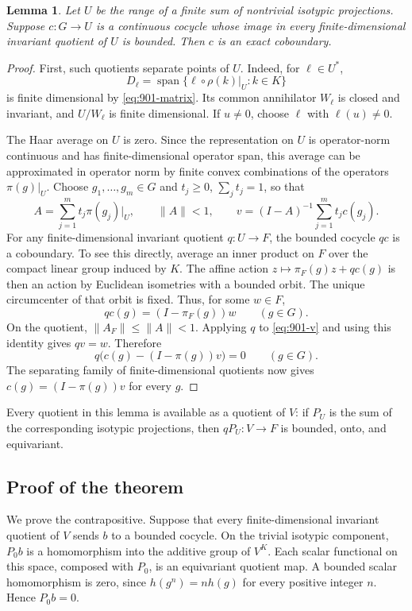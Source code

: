 \documentclass[11pt,a4paper]{article}
\newtheorem{lemma}[theorem]{Lemma}
\theoremstyle{remark}
\begin{document}
\begin{lemma}\label{lem:901-type}
Let $U$ be the range of a finite sum of nontrivial isotypic projections.
Suppose $c:G\to U$ is a continuous cocycle whose image in every
finite-dimensional invariant quotient of $U$ is bounded. Then $c$ is an
exact coboundary.
\end{lemma}

\begin{proof}
First, such quotients separate points of $U$. Indeed, for $\ell\in U^*$,
\[
 D_\ell=\operatorname{span}\{\ell\circ\rho(k)|_U:k\in K\}
\]
is finite dimensional by \eqref{eq:901-matrix}. Its common annihilator
$W_\ell$ is closed and invariant, and $U/W_\ell$ is finite dimensional.
If $u\ne0$, choose $\ell$ with $\ell(u)\ne0$.

The Haar average on $U$ is zero. Since the representation on $U$ is
operator-norm continuous and has finite-dimensional operator span, this
average can be approximated in operator norm by finite convex combinations
of the operators $\pi(g)|_U$. Choose $g_1,\ldots,g_m\in G$ and
$t_j\ge0$, $\sum_jt_j=1$, so that
\[
 A=\sum_{j=1}^m t_j\pi(g_j)|_U,\qquad \|A\|<1,
 \qquad
 v=(I-A)^{-1}\sum_{j=1}^m t_jc(g_j).
 \tag{901.3}\label{eq:901-v}
\]
For any finite-dimensional invariant quotient $q:U\to F$, the bounded
cocycle $qc$ is a coboundary. To see this directly, average an inner
product on $F$ over the compact linear group induced by $K$. The affine
action $z\mapsto\pi_F(g)z+qc(g)$ is then an action by Euclidean isometries
with a bounded orbit. The unique circumcenter of that orbit is fixed.
Thus, for some $w\in F$,
\[
 qc(g)=(I-\pi_F(g))w\qquad(g\in G).
\]
On the quotient, $\|A_F\|\le\|A\|<1$. Applying $q$ to
\eqref{eq:901-v} and using this identity gives $qv=w$. Therefore
\[
 q\bigl(c(g)-(I-\pi(g))v\bigr)=0\qquad(g\in G).
\]
The separating family of finite-dimensional quotients now gives
$c(g)=(I-\pi(g))v$ for every $g$.
\end{proof}

Every quotient in this lemma is available as a quotient of $V$: if $P_U$
is the sum of the corresponding isotypic projections, then
$qP_U:V\to F$ is bounded, onto, and equivariant.

\subsection{Proof of the theorem}

We prove the contrapositive. Suppose that every finite-dimensional invariant
quotient of $V$ sends $b$ to a bounded cocycle. On the trivial isotypic
component, $P_0b$ is a homomorphism into the additive group of $V^K$.
Each scalar functional on this space, composed with $P_0$, is an
equivariant quotient map. A bounded scalar homomorphism is zero, since
$h(g^n)=nh(g)$ for every positive integer $n$. Hence $P_0b=0$.
\end{document}
